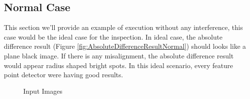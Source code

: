 	\subsection{Normal Case}
		This section we'll provide an example of execution without any interference, this case would be the ideal case for the inspection.
		In ideal case, the absolute difference result (Figure \ref{fig:AbsoluteDifferenceResultNormal}) should looks like a plane black image. If there is any misalignment, the absolute difference result would appear radius shaped bright spots.
		In this ideal scenario, every feature point detector were having good results.
		\begin{figure}[H]
			\caption{Input Images}
			\label{fig:RawImages}
		\end{figure}

